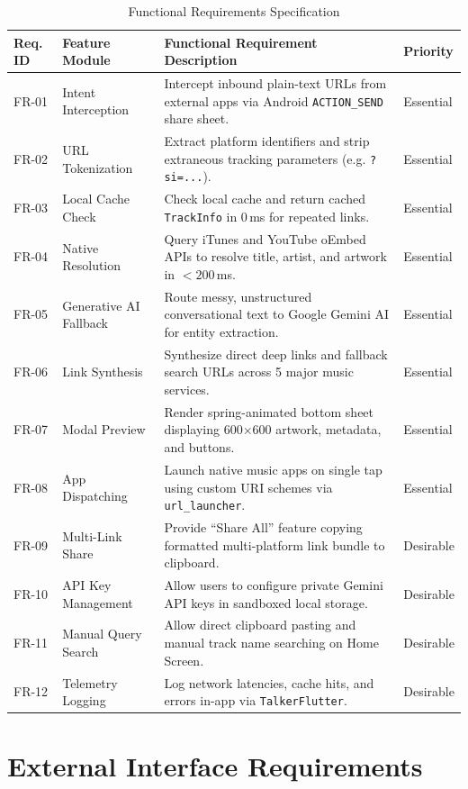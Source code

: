 \documentclass[12pt,a4paper]{report}
\begin{document}
\begin{table}[H]
\centering
\caption{Functional Requirements Specification}
\label{tab:func_req}
\begin{tabularx}{\textwidth}{lp{3.5cm}Xl}
\toprule
\textbf{Req. ID} & \textbf{Feature Module} & \textbf{Functional Requirement Description} & \textbf{Priority} \\
\midrule
FR-01 & Intent Interception & Intercept inbound plain-text URLs from external apps via Android \texttt{ACTION\_SEND} share sheet. & Essential \\
FR-02 & URL Tokenization & Extract platform identifiers and strip extraneous tracking parameters (e.g. \texttt{?si=...}). & Essential \\
FR-03 & Local Cache Check & Check local cache and return cached \texttt{TrackInfo} in 0\,ms for repeated links. & Essential \\
FR-04 & Native Resolution & Query iTunes and YouTube oEmbed APIs to resolve title, artist, and artwork in $<200$\,ms. & Essential \\
FR-05 & Generative AI Fallback & Route messy, unstructured conversational text to Google Gemini AI for entity extraction. & Essential \\
FR-06 & Link Synthesis & Synthesize direct deep links and fallback search URLs across 5 major music services. & Essential \\
FR-07 & Modal Preview & Render spring-animated bottom sheet displaying 600$\times$600 artwork, metadata, and buttons. & Essential \\
FR-08 & App Dispatching & Launch native music apps on single tap using custom URI schemes via \texttt{url\_launcher}. & Essential \\
FR-09 & Multi-Link Share & Provide ``Share All'' feature copying formatted multi-platform link bundle to clipboard. & Desirable \\
FR-10 & API Key Management & Allow users to configure private Gemini API keys in sandboxed local storage. & Desirable \\
FR-11 & Manual Query Search & Allow direct clipboard pasting and manual track name searching on Home Screen. & Desirable \\
FR-12 & Telemetry Logging & Log network latencies, cache hits, and errors in-app via \texttt{TalkerFlutter}. & Desirable \\
\bottomrule
\end{tabularx}
\end{table}

\section{External Interface Requirements}
\end{document}
